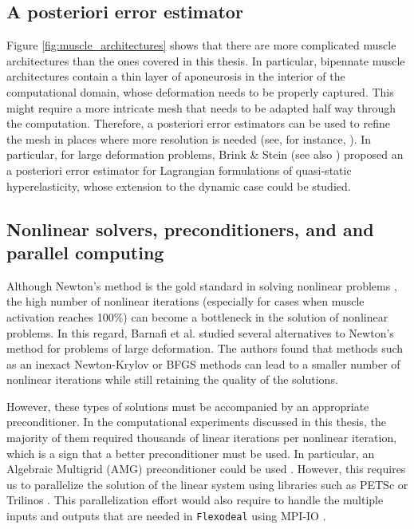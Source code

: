\documentclass{sfuthesis}
\numberwithin{equation}{section}
\numberwithin{figure}{chapter}
\numberwithin{table}{chapter}
\theoremstyle{definition}
\begin{document}
\subsection{A posteriori error estimator}

Figure \ref{fig:muscle_architectures} shows that there are more complicated muscle architectures than the ones covered in this thesis. In particular, bipennate muscle architectures contain a thin layer of aponeurosis in the interior of the computational domain, whose deformation needs to be properly captured. This might require a more intricate mesh that needs to be adapted half way through the computation. 
Therefore, a posteriori error estimators can be used to refine the mesh in places where more resolution is needed (see, for instance, \cite{Almonacid2019APosteriori}). In particular, for large deformation problems, Brink \& Stein \cite{BrinkStein1998} (see also \cite{RuterStein2000}) proposed an a posteriori error estimator for Lagrangian formulations of quasi-static hyperelasticity, whose extension to the dynamic case could be studied.

\subsection{Nonlinear solvers, preconditioners, and and parallel computing}

Although Newton's method is the gold standard in solving nonlinear problems \cite{ZienkiewiczTaylorFEM}, the high number of nonlinear iterations (especially for cases when muscle activation reaches 100\%) can become a bottleneck in the solution of nonlinear problems. In this regard, Barnafi et al. studied several alternatives to Newton's method for problems of large deformation. The authors found that methods such as an inexact Newton-Krylov or BFGS methods can lead to a smaller number of nonlinear iterations while still retaining the quality of the solutions.

However, these types of solutions must be accompanied by an appropriate preconditioner. In the computational experiments discussed in this thesis, the majority of them required thousands of linear iterations per nonlinear iteration, which is a sign that a better preconditioner must be used. In particular, an Algebraic Multigrid (AMG) preconditioner could be used \cite{Barnafi2022}. However, this requires us to parallelize the solution of the linear system using libraries such as PETSc \cite{petsc} or Trilinos \cite{trilinos}. This parallelization effort would also require to handle the multiple inputs and outputs that are needed in \texttt{Flexodeal} using MPI-IO \cite{ChoppBook}.
\end{document}
